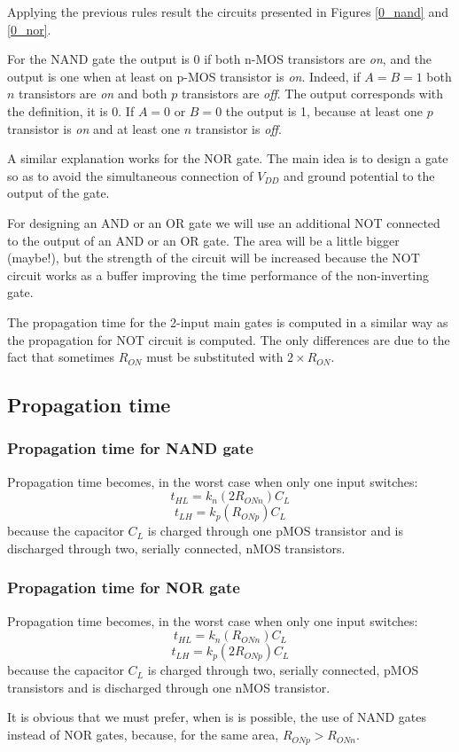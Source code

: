 Applying the previous rules result the circuits presented in
Figures \ref{0_nand} and \ref{0_nor}.




For the NAND gate the output is 0 if both n-MOS transistors are
{\em on}, and the output is one when at least on p-MOS transistor
is {\em on}. Indeed, if $A=B=1$ both $n$ transistors are {\em on}
and both $p$ transistors are {\em off}. The output corresponds
with the definition, it is 0. If $A=0$ or $B=0$ the output is 1,
because at least one $p$ transistor is {\em on} and at least one
$n$ transistor is {\em off}.

A similar explanation works for the NOR gate. The main idea is to
design a gate so as to avoid the simultaneous connection of
$V_{DD}$ and ground potential to the output of the gate.

For designing an AND or an OR gate we will use an additional NOT connected to the output of an AND or an OR gate. The
area will be a little bigger (maybe!), but the strength of the circuit will be
increased because the NOT circuit works as a buffer improving the
time performance of the non-inverting gate.

The propagation time for the 2-input main gates is computed in a similar way as the propagation for NOT circuit is  computed. The only differences are due to the fact that sometimes $R_{ON}$ must be substituted with $2 \times R_{ON}$.

\subsection{Propagation time}

\subsubsection{Propagation time for NAND gate} 

Propagation time becomes, in the worst case when only one input switches:
$$t_{HL} = k_n(2R_{ONn})C_L$$
$$t_{LH} = k_p(R_{ONp})C_L$$
because the capacitor $C_L$ is charged through one pMOS transistor and is discharged through two, serially connected, nMOS transistors.

\subsubsection{Propagation time for NOR gate} 

Propagation time becomes, in the worst case when only one input switches:
$$t_{HL} = k_n(R_{ONn})C_L$$
$$t_{LH} = k_p(2R_{ONp})C_L$$
because the capacitor $C_L$ is charged through two, serially connected, pMOS transistors and is discharged through one nMOS transistor.

\bigskip

It is obvious that we must prefer, when is is possible, the use of NAND gates instead of NOR gates, because, for the same area, $R_{ONp} > R_{ONn}$.

